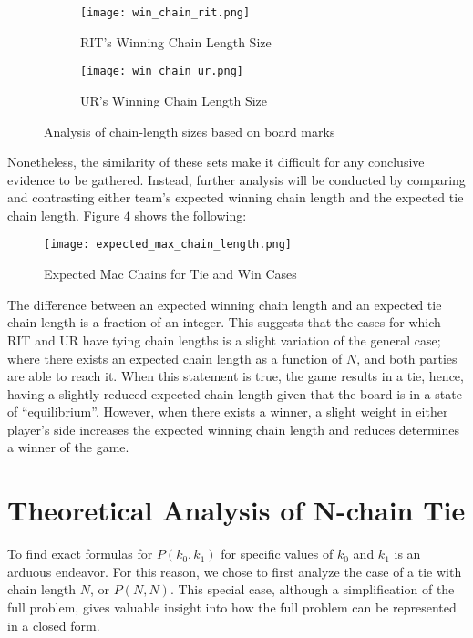 \documentclass[12pt]{article}
\theoremstyle{definition}
\theoremstyle{theorem}
\begin{document}
\begin{figure}[H]
  \centering
  \begin{subfigure}{.5\textwidth}
    \centering
    \texttt{[image: win\_chain\_rit.png]}
    \caption{RIT's Winning Chain Length Size}
  \end{subfigure}%
  \begin{subfigure}{.5\textwidth}
    \centering
    \texttt{[image: win\_chain\_ur.png]}
    \caption{UR's Winning Chain Length Size}
  \end{subfigure}
  \caption{Analysis of chain-length sizes based on board marks}
\end{figure}


Nonetheless, the similarity of these sets make it difficult for any conclusive evidence to be gathered. Instead, further analysis will be conducted by comparing and contrasting either team's expected winning chain length and the expected tie chain length.
Figure $4$ shows the following:

\begin{figure}[H]
  \centering
  \texttt{[image: expected\_max\_chain\_length.png]}
  \caption{Expected Mac Chains for Tie and Win Cases}
\end{figure}

The difference between an expected winning chain length and an expected tie chain length is a fraction of an integer. This suggests that the cases for which RIT and UR have tying chain lengths is a slight variation of the general case; where there exists an expected chain length as a function of $N$, and both parties are able to reach it. When this statement is true, the game results in a tie, hence, having a slightly reduced expected chain length given that the board is in a state of ``equilibrium''. However, when there exists a winner, a slight weight in either player's side increases the expected winning chain length and reduces determines a winner of the game.

\section{Theoretical Analysis of N-chain Tie}

To find exact formulas for $P(k_0, k_1)$ for specific values of $k_0$ and $k_1$ is an arduous endeavor. For this reason, we chose to first analyze the case of a tie with chain length $N$, or $P(N, N)$. This special case, although a simplification of the full problem, gives valuable insight into how the full problem can be represented in a closed form.
\end{document}
